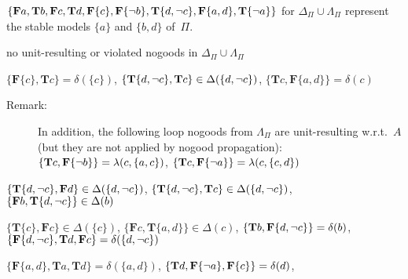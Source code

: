 \begin{Loesung}
{$\{\mathbf{F}a,\mathbf{T}b,\mathbf{F}c,\mathbf{T}d,
   \mathbf{F}\{c\},\mathbf{F}\{{\neg{b}}\},\mathbf{T}\{d,{\neg{c}}\},\mathbf{F}\{a,d\},\mathbf{T}\{{\neg{a}}\}\}$
for 
$\Delta_\Pi\cup\Lambda_\Pi$ %
represent the stable models $\{a\}$ and $\{b,d\}$ of~$\Pi$.
\begin{UList}
\item no unit-resulting or violated nogoods in $\Delta_\Pi\cup\Lambda_\Pi$
\item $\{\mathbf{F}\{c\},\mathbf{T}c\}=\delta(\{c\})$,\newline
      $\{\mathbf{T}\{d,{\neg{c}}\},\mathbf{T}c\}\in\Delta(\{d,{\neg{c}}\})$,\newline
      $\{\mathbf{T}c,\mathbf{F}\{a,d\}\}=\delta(c)$
      \begin{description}
      \item[Remark:]
      In addition, the following loop nogoods from $\Lambda_\Pi$ are unit-resulting w.r.t.~$A$
      (but they are not applied by nogood propagation):\newline
      $\{\mathbf{T}c,\mathbf{F}\{{\neg{b}}\}\}=\lambda(c,\{a,c\})$,\newline
      $\{\mathbf{T}c,\mathbf{F}\{{\neg{a}}\}\}=\lambda(c,\{c,d\})$
      \end{description}
\item $\{\mathbf{T}\{d,{\neg{c}}\},\mathbf{F}d\}\in\Delta(\{d,{\neg{c}}\})$,\newline
      $\{\mathbf{T}\{d,{\neg{c}}\},\mathbf{T}c\}\in\Delta(\{d,{\neg{c}}\})$,\newline
      $\{\mathbf{F}b,\mathbf{T}\{d,{\neg{c}}\}\}\in\Delta(b)$
\item $\{\mathbf{T}\{c\},\mathbf{F}c\}\in\Delta(\{c\})$,\newline
      $\{\mathbf{F}c,\mathbf{T}\{a,d\}\}\in\Delta(c)$,\newline
      $\{\mathbf{T}b,\mathbf{F}\{d,{\neg{c}}\}\}=\delta(b)$,\newline
      $\{\mathbf{F}\{d,{\neg{c}}\},\mathbf{T}d,\mathbf{F}c\}=\delta(\{d,{\neg{c}}\})$
\item $\{\mathbf{F}\{a,d\},\mathbf{T}a,\mathbf{T}d\}=\delta(\{a,d\})$,\newline
      $\{\mathbf{T}d,\mathbf{F}\{{\neg{a}}\},\mathbf{F}\{c\}\}=\delta(d)$,\newline

\end{UList}}
\end{Loesung}
